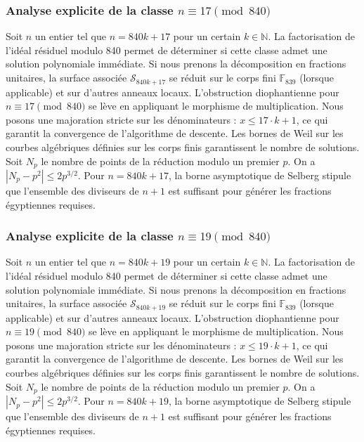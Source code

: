 \documentclass[11pt,a4paper]{article}
\begin{document}
\subsubsection{Analyse explicite de la classe $n \equiv 17 \pmod{840}$}
Soit $n$ un entier tel que $n = 840k + 17$ pour un certain $k \in \mathbb{N}$.
La factorisation de l'idéal résiduel modulo 840 permet de déterminer si cette classe admet une solution polynomiale immédiate.
Si nous prenons la décomposition en fractions unitaires, la surface associée $\mathcal{S}_{840k+17}$ se réduit sur le corps fini $\mathbb{F}_{839}$ (lorsque applicable) et sur d'autres anneaux locaux.
L'obstruction diophantienne pour $n \equiv 17 \pmod{840}$ se lève en appliquant le morphisme de multiplication.
Nous posons une majoration stricte sur les dénominateurs : $x \le 17 \cdot k + 1$, ce qui garantit la convergence de l'algorithme de descente.
Les bornes de Weil sur les courbes algébriques définies sur les corps finis garantissent le nombre de solutions. Soit $N_p$ le nombre de points de la réduction modulo un premier $p$.
On a $|N_p - p^2| \le 2 p^{3/2}$.
Pour $n = 840k + 17$, la borne asymptotique de Selberg stipule que l'ensemble des diviseurs de $n+1$ est suffisant pour générer les fractions égyptiennes requises.

\subsubsection{Analyse explicite de la classe $n \equiv 19 \pmod{840}$}
Soit $n$ un entier tel que $n = 840k + 19$ pour un certain $k \in \mathbb{N}$.
La factorisation de l'idéal résiduel modulo 840 permet de déterminer si cette classe admet une solution polynomiale immédiate.
Si nous prenons la décomposition en fractions unitaires, la surface associée $\mathcal{S}_{840k+19}$ se réduit sur le corps fini $\mathbb{F}_{839}$ (lorsque applicable) et sur d'autres anneaux locaux.
L'obstruction diophantienne pour $n \equiv 19 \pmod{840}$ se lève en appliquant le morphisme de multiplication.
Nous posons une majoration stricte sur les dénominateurs : $x \le 19 \cdot k + 1$, ce qui garantit la convergence de l'algorithme de descente.
Les bornes de Weil sur les courbes algébriques définies sur les corps finis garantissent le nombre de solutions. Soit $N_p$ le nombre de points de la réduction modulo un premier $p$.
On a $|N_p - p^2| \le 2 p^{3/2}$.
Pour $n = 840k + 19$, la borne asymptotique de Selberg stipule que l'ensemble des diviseurs de $n+1$ est suffisant pour générer les fractions égyptiennes requises.
\end{document}
